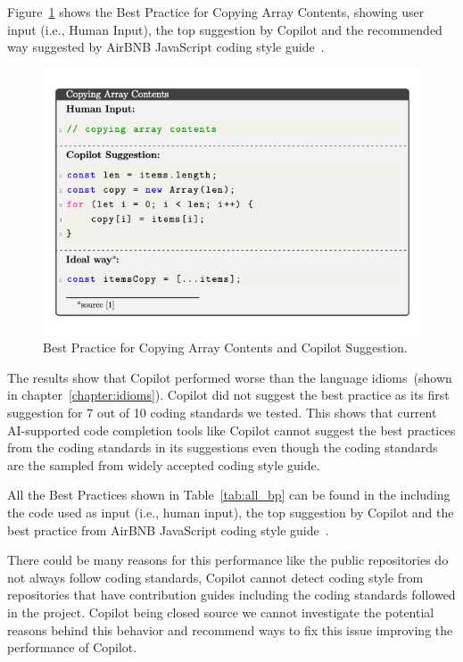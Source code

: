 Figure~\ref{fig:bp_1} shows the Best Practice for Copying Array Contents, showing user input (i.e., Human Input), the top suggestion by Copilot and the recommended way suggested by AirBNB JavaScript coding style guide~\cite{airbnb_code}.

\begin{figure}[hbt!]
    \centering
    \includegraphics[width=\linewidth]{Figures/bp_1.png}
    \caption{Best Practice for Copying Array Contents and Copilot Suggestion.}
    \label{fig:bp_1}
\end{figure}

The results show that Copilot performed worse than the language idioms~(shown in chapter~\ref{chapter:idioms}). Copilot did not suggest the best practice as its first suggestion for 7 out of 10 coding standards we tested. This shows that current AI-supported
code completion tools like Copilot cannot suggest the best practices from the coding standards in its suggestions even though the coding standards are the sampled from widely accepted coding style guide.

All the Best Practices shown in Table~\ref{tab:all_bp} can be found in the \repl{} including the code used as input (i.e., human input), the top suggestion by Copilot and the best practice from AirBNB JavaScript coding style guide~\cite{airbnb_code}.

There could be many reasons for this performance like the public repositories do not always follow coding standards, Copilot cannot detect coding style from repositories that have contribution guides including the coding standards followed in the project. 
Copilot being closed source we cannot investigate the potential reasons behind this behavior and recommend ways to fix this issue improving the performance of Copilot.

